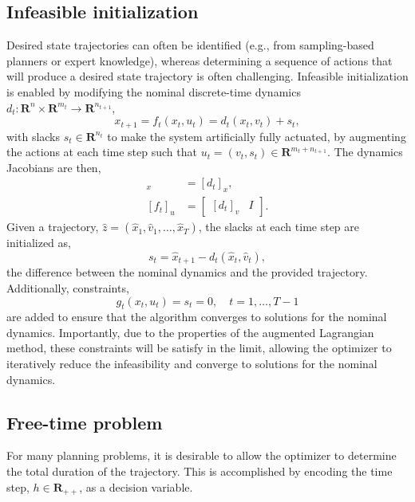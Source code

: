 \subsection{Infeasible initialization}
Desired state trajectories can often be identified (e.g., from sampling-based planners or expert knowledge), whereas determining a sequence of actions that will produce a desired state trajectory is often challenging. Infeasible initialization is enabled by modifying the nominal discrete-time dynamics $d_t : \mathbf{R}^{n} \times \mathbf{R}^{m_t} \rightarrow \mathbf{R}^{n_{t+1}}$,
\begin{equation}
	x_{t+1} = f_t(x_t,u_t) = d_t(x_t, v_t) + s_t \label{altro_slack_dynamics},
\end{equation}
with slacks $s_t \in \mathbf{R}^{n_t}$ to make the system artificially fully actuated, by augmenting the actions at each time step such that $u_t = (v_t, s_t) \in \mathbf{R}^{m_t + n_{t+1}}$. The dynamics Jacobians are then,
\begin{align}
	[f_t]_x &= [d_t]_x, \\
	[f_t]_u &= \begin{bmatrix} [d_t]_v & I \end{bmatrix}.
\end{align}
Given a trajectory, $\hat{z} = (\hat{x}_1, \hat{v}_1, \dots, \hat{x}_T)$, the slacks at each time step are initialized as,
\begin{equation}
	s_t = \hat{x}_{t+1} - d_t(\hat{x}_t, \hat{v}_t), \label{altro_slack_actions}
\end{equation}
the difference between the nominal dynamics and the provided trajectory. Additionally, constraints, 
\begin{equation}
	g_t(x_t, u_t) = s_t = 0, \quad t = 1, \dots, T-1
\end{equation}
are added to ensure that the algorithm converges to solutions for the nominal dynamics. Importantly, due to the properties of the augmented Lagrangian method, these constraints will be satisfy in the limit, allowing the optimizer to iteratively reduce the infeasibility and converge to solutions for the nominal dynamics.

\subsection{Free-time problem}
For many planning problems, it is desirable to allow the optimizer to determine the total duration of the trajectory. This is accomplished by encoding the time step, $h \in \mathbf{R}_{++}$, as a decision variable.

